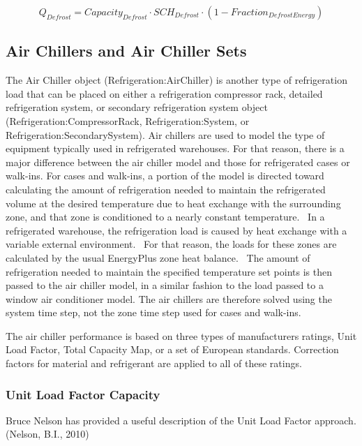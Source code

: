\begin{equation}
Q_{Defrost} = Capacity_{Defrost} \cdot SCH_{Defrost} \cdot (1- Fraction_{DefrostEnergy})
\end{equation}

\subsection{Air Chillers and Air Chiller Sets}\label{air-chillers-and-air-chiller-sets}

The Air Chiller object (Refrigeration:AirChiller) is another type of refrigeration load that can be placed on either a refrigeration compressor rack, detailed refrigeration system, or secondary refrigeration system object (Refrigeration:CompressorRack, Refrigeration:System, or Refrigeration:SecondarySystem). Air chillers are used to model the type of equipment typically used in refrigerated warehouses. For that reason, there is a major difference between the air chiller model and those for refrigerated cases or walk-ins. For cases and walk-ins, a portion of the model is directed toward calculating the amount of refrigeration needed to maintain the refrigerated volume at the desired temperature due to heat exchange with the surrounding zone, and that zone is conditioned to a nearly constant temperature.~ In a refrigerated warehouse, the refrigeration load is caused by heat exchange with a variable external environment.~ For that reason, the loads for these zones are calculated by the usual EnergyPlus zone heat balance.~ The amount of refrigeration needed to maintain the specified temperature set points is then passed to the air chiller model, in a similar fashion to the load passed to a window air conditioner model. The air chillers are therefore solved using the system time step, not the zone time step used for cases and walk-ins.

The air chiller performance is based on three types of manufacturers ratings, Unit Load Factor, Total Capacity Map, or a set of European standards. Correction factors for material and refrigerant are applied to all of these ratings.

\subsubsection{Unit Load Factor Capacity}\label{unit-load-factor-capacity}

Bruce Nelson has provided a useful description of the Unit Load Factor approach.(Nelson, B.I., 2010)

